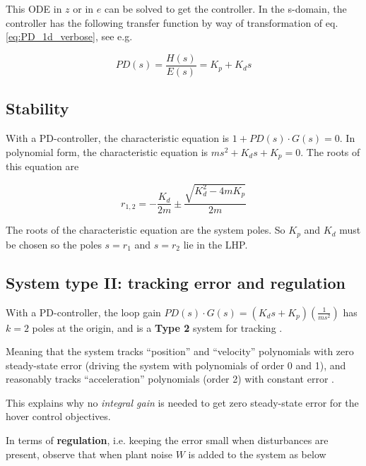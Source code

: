 \documentclass[a4paper]{report}
\begin{document}
This \gls{ODE} in $z$ or in $e$ can be solved to get the controller. In the s-domain, the controller has the following transfer function by way of transformation of eq. \ref{eq:PD_1d_verbose}, see e.g. \cite[p. 201]{franklin}

\begin{equation} \label{eq:PD_1d_s}
PD(s) = \frac{H(s)}{E(s)} = K_p + K_d s
\end{equation}

\subsection{Stability}

With a PD-controller, the characteristic equation is $1+ PD(s)\cdot G(s) = 0$.
In polynomial form, the characteristic equation is $ms^2 + K_d s + K_p = 0$.
The roots of this equation are

\begin{equation} \label{eq:cl_poles}
r_{1,2} = -\frac{K_d}{2m} \pm \frac{\sqrt{K_d^2 - 4 m K_p}}{2m}
\end{equation}

The roots of the characteristic equation are the system poles.
So $K_p$ and $K_d$ must be chosen so the poles $s=r_1$ and $s=r_2$ lie in the \gls{LHP}.

\subsection{System type II: tracking error and regulation}

With a PD-controller, the loop gain $PD(s) \cdot G(s) = \left(K_d s + K_p \right) \left( \frac{1}{ms^2} \right)$ has $k=2$ poles at the origin, and is a \textbf{Type 2} system for tracking \cite[p. 190 and p. 217]{franklin}. 

Meaning that the system tracks ``position'' and ``velocity'' polynomials with zero steady-state error (driving the system with polynomials of order 0 and 1), and reasonably tracks ``acceleration'' polynomials (order 2) with constant error \cite[p. 190]{franklin}.

This explains why no \textit{integral gain} is needed to get zero steady-state error for the hover control objectives.


In terms of \textbf{regulation}, i.e. keeping the error small when disturbances are present, observe that when plant noise $W$ is added to the system as below
\end{document}
